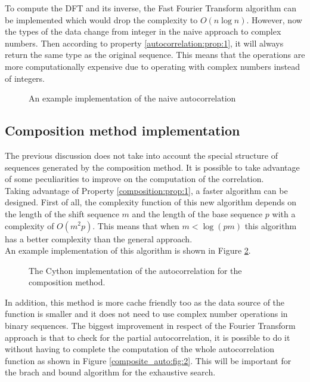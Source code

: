         To compute the DFT and its inverse, the Fast Fourier
        Transform\cite{fast_fourier_transform} algorithm can be implemented
        which would drop the complexity to $O(n \log n)$.  However, now the types
        of the data change from integer in the naive approach to complex
        numbers. Then according to property \ref{autocorrelation:prop:1}, it will
        always return the same type as the original sequence. This means that the
        operations are more computationally expensive due to operating with
        complex numbers instead of integers.
          \begin{figure}
            \caption{An example implementation of the naive autocorrelation}
            \label{naive_auto:fig:1}
          \end{figure}

      \subsection{Composition method implementation}

      The previous discussion does not take into account the special structure of
      sequences generated by the composition method. It is possible to take
      advantage of some peculiarities to improve on the computation of the
      correlation.\\

     Taking advantage of Property \ref{composition:prop:1}, a faster algorithm can
     be designed. First of all, the complexity function of this new algorithm
     depends on the length of the shift sequence $m$  and the length of the base
     sequence $p$ with a complexity of $O(m^2p)$. This means
     that when $m < \log(pm)$ this algorithm has a better complexity than the
     general approach.\\

     An example implementation of this algorithm is shown in Figure
     \ref{composite_auto:fig:1}.

     \begin{figure}[ht!]
       \caption{The Cython implementation of the autocorrelation for the composition method.}
       \label{composite_auto:fig:1}
     \end{figure}

      In addition, this method is more cache friendly too as the data source of
      the function is smaller and it does not need to use complex number
      operations in binary sequences. The biggest improvement in respect of the
      Fourier Transform approach is that to check for the partial autocorrelation,
      it is possible to do it without having to complete the computation of the
      whole autocorrelation function as shown in Figure
      \ref{composite_auto:fig:2}. This will be important for the brach and
      bound algorithm for the exhaustive search.\\


